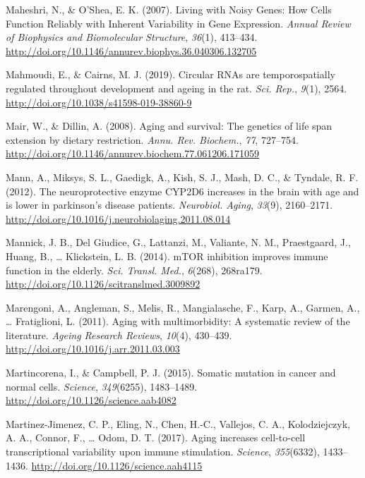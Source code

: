 \documentclass[12pt,twoside]{unicam}
\begin{document}
\begin{cslreferences}
\leavevmode\hypertarget{ref-Maheshri2007}{}%
Maheshri, N., \& O'Shea, E. K. (2007). Living with Noisy Genes: How Cells Function Reliably with Inherent Variability in Gene Expression. \emph{Annual Review of Biophysics and Biomolecular Structure}, \emph{36}(1), 413--434. \url{http://doi.org/10.1146/annurev.biophys.36.040306.132705}

\leavevmode\hypertarget{ref-Mahmoudi2019}{}%
Mahmoudi, E., \& Cairns, M. J. (2019). Circular RNAs are temporospatially regulated throughout development and ageing in the rat. \emph{Sci. Rep.}, \emph{9}(1), 2564. \url{http://doi.org/10.1038/s41598-019-38860-9}

\leavevmode\hypertarget{ref-Mair2008}{}%
Mair, W., \& Dillin, A. (2008). Aging and survival: The genetics of life span extension by dietary restriction. \emph{Annu. Rev. Biochem.}, \emph{77}, 727--754. \url{http://doi.org/10.1146/annurev.biochem.77.061206.171059}

\leavevmode\hypertarget{ref-Mann2012}{}%
Mann, A., Miksys, S. L., Gaedigk, A., Kish, S. J., Mash, D. C., \& Tyndale, R. F. (2012). The neuroprotective enzyme CYP2D6 increases in the brain with age and is lower in parkinson's disease patients. \emph{Neurobiol. Aging}, \emph{33}(9), 2160--2171. \url{http://doi.org/10.1016/j.neurobiolaging.2011.08.014}

\leavevmode\hypertarget{ref-Mannick2014}{}%
Mannick, J. B., Del Giudice, G., Lattanzi, M., Valiante, N. M., Praestgaard, J., Huang, B., \ldots{} Klickstein, L. B. (2014). mTOR inhibition improves immune function in the elderly. \emph{Sci. Transl. Med.}, \emph{6}(268), 268ra179. \url{http://doi.org/10.1126/scitranslmed.3009892}

\leavevmode\hypertarget{ref-Marengoni2011}{}%
Marengoni, A., Angleman, S., Melis, R., Mangialasche, F., Karp, A., Garmen, A., \ldots{} Fratiglioni, L. (2011). Aging with multimorbidity: A systematic review of the literature. \emph{Ageing Research Reviews}, \emph{10}(4), 430--439. \url{http://doi.org/10.1016/j.arr.2011.03.003}

\leavevmode\hypertarget{ref-Martincorena2015}{}%
Martincorena, I., \& Campbell, P. J. (2015). Somatic mutation in cancer and normal cells. \emph{Science}, \emph{349}(6255), 1483--1489. \url{http://doi.org/10.1126/science.aab4082}

\leavevmode\hypertarget{ref-Martinez-Jimenez2017}{}%
Martinez-Jimenez, C. P., Eling, N., Chen, H.-C., Vallejos, C. A., Kolodziejczyk, A. A., Connor, F., \ldots{} Odom, D. T. (2017). Aging increases cell-to-cell transcriptional variability upon immune stimulation. \emph{Science}, \emph{355}(6332), 1433--1436. \url{http://doi.org/10.1126/science.aah4115}


\end{cslreferences}
\end{document}
